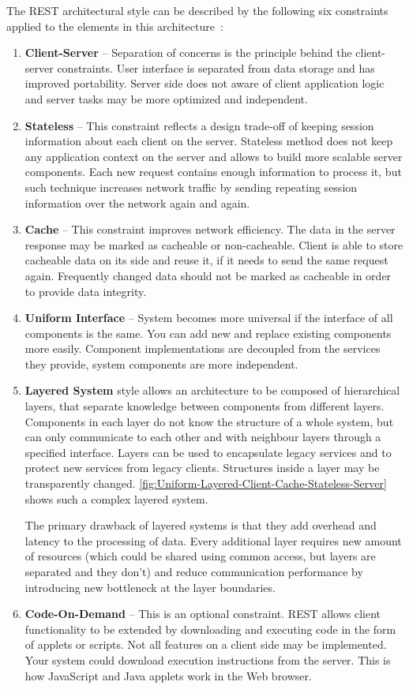 The REST architectural style can be described by the following six constraints
applied to the elements in this architecture~\cite{Fielding2000}:
\begin{enumerate}
  \item \textbf{Client-Server} --
  Separation of concerns is the principle behind the client-server constraints.
  User interface is separated from data storage and has improved portability.
  Server side does not aware of client application logic and server tasks may be
  more optimized and independent.
  \item \textbf{Stateless} --
  This constraint reflects a design trade-off of keeping session
  information about each client on the server. Stateless method does not keep
  any application context on the server and allows to build more scalable server
  components. Each new request contains enough information to process it, but
  such technique increases network traffic by sending repeating session
  information over the network again and again.
  \item \textbf{Cache} --
  This constraint improves network efficiency. The data in the server response
  may be marked as cacheable or non-cacheable. Client is able to store cacheable
  data on its side and reuse it, if it needs to send the same request again.
  Frequently changed data should not be marked as cacheable in order to provide
  data integrity.
  \item \textbf{Uniform Interface} --
  System becomes more universal if the interface of all components is the same.
  You can add new and replace existing components more easily. Component
  implementations are decoupled from the services they provide, system
  components are more independent. 
  \item \textbf{Layered System} style allows an architecture to be composed of hierarchical
  layers, that separate knowledge between components from different layers.
  Components in each layer do not know the structure of a whole system, but can
  only communicate to each other and with neighbour layers through a specified
  interface. Layers can be used to encapsulate legacy services and to protect
  new services from legacy clients. Structures inside a layer may be
  transparently changed.
  \autoref{fig:Uniform-Layered-Client-Cache-Stateless-Server} shows such a
  complex layered system.
  
  The primary drawback of layered systems is that they add overhead and latency
  to the processing of data. Every additional layer requires new amount of
  resources (which could be shared using common access, but layers are
  separated and they don't) and reduce communication performance by introducing
  new bottleneck at the layer boundaries.
  \item \textbf{Code-On-Demand} --
  This is an optional constraint. REST allows client functionality to be extended
  by downloading and executing code in the form of applets or scripts. Not all
  features on a client side may be implemented. Your system could download
  execution instructions from the server. This is how JavaScript and Java
  applets work in the Web browser.
 
\end{enumerate}
